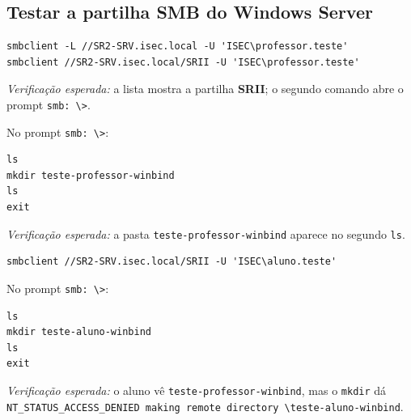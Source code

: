 
\subsection[Testar a partilha SMB do Windows Server]{Testar a partilha SMB do Windows Server}


\begin{lstlisting}[style=bashstyle]
smbclient -L //SR2-SRV.isec.local -U 'ISEC\professor.teste'
smbclient //SR2-SRV.isec.local/SRII -U 'ISEC\professor.teste'
\end{lstlisting}

\emph{Verificação esperada:} a lista mostra a partilha \textbf{SRII}; o segundo comando abre o prompt \texttt{smb: \textbackslash{}\textgreater{}}.


No prompt \texttt{smb: \textbackslash{}\textgreater{}}:

\begin{lstlisting}[style=cfgstyle]
ls
mkdir teste-professor-winbind
ls
exit
\end{lstlisting}

\emph{Verificação esperada:} a pasta \texttt{teste-professor-winbind} aparece no segundo \texttt{ls}.


\begin{lstlisting}[style=bashstyle]
smbclient //SR2-SRV.isec.local/SRII -U 'ISEC\aluno.teste'
\end{lstlisting}

No prompt \texttt{smb: \textbackslash{}\textgreater{}}:

\begin{lstlisting}[style=cfgstyle]
ls
mkdir teste-aluno-winbind
ls
exit
\end{lstlisting}

\emph{Verificação esperada:} o aluno vê \texttt{teste-professor-winbind}, mas o \texttt{mkdir} dá \texttt{NT\_STATUS\_ACCESS\_DENIED making remote directory \textbackslash{}teste-aluno-winbind}.

